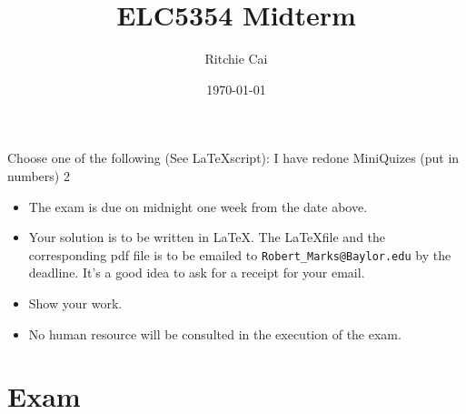 \documentclass{assignment}
\author{Ritchie Cai}
\title{ELC5354 Midterm}
\date{\today}
\begin{document}
\maketitle

\begin{center}
  Choose one of the following (See \LaTeX script):
  I have redone MiniQuizes (put in numbers) 2
\end{center}

\begin{itemize}
\item The exam is due on midnight one week from the date above.
\item Your solution is to be written in \LaTeX. The \LaTeX file and the corresponding pdf file is to be emailed to \verb"Robert_Marks@Baylor.edu" by the deadline. It's a good idea to ask for a receipt for your email.
\item Show your work.
\item No human resource will be consulted in the execution of the exam.
\end{itemize}


\section*{Exam}







\end{document}
